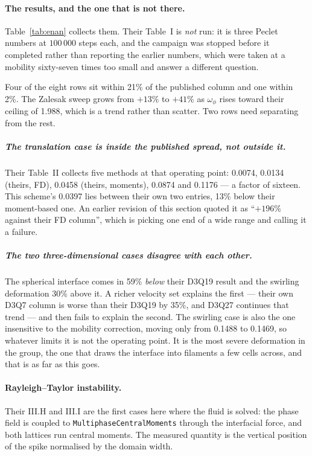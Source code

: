 \documentclass[11pt,a4paper]{article}
\newcommand{\code}[1]{\texttt{\small #1}}
\begin{document}
\paragraph{The results, and the one that is not there.} Table~\ref{tab:enan}
collects them. Their Table~I is \emph{not} run: it is three Peclet numbers at
$100\,000$ steps each, and the campaign was stopped before it completed rather
than reporting the earlier numbers, which were taken at a mobility sixty-seven
times too small and answer a different question.

Four of the eight rows sit within 21\% of the published column and one within
2\%. The Zalesak sweep grows from $+13\%$ to $+41\%$ as $\omega_\phi$ rises
toward their ceiling of 1.988, which is a trend rather than scatter. Two rows
need separating from the rest.

\subparagraph{The translation case is inside the published spread, not outside
it.} Their Table~II collects five methods at that operating point: 0.0074,
0.0134 (theirs, FD), 0.0458 (theirs, moments), 0.0874 and 0.1176 --- a factor
of sixteen. This scheme's 0.0397 lies between their own two entries, 13\% below
their moment-based one. An earlier revision of this section quoted it as
``$+196\%$ against their FD column'', which is picking one end of a wide range
and calling it a failure.

\subparagraph{The two three-dimensional cases disagree with each other.} The
spherical interface comes in 59\% \emph{below} their D3Q19 result and the
swirling deformation 30\% above it. A richer velocity set explains the first
--- their own D3Q7 column is worse than their D3Q19 by 35\%, and D3Q27
continues that trend --- and then fails to explain the second. The swirling
case is also the one insensitive to the mobility correction, moving only from
0.1488 to 0.1469, so whatever limits it is not the operating point. It is the
most severe deformation in the group, the one that draws the interface into
filaments a few cells across, and that is as far as this goes.

\paragraph{Rayleigh--Taylor instability.} Their III.H and III.I are the first
cases here where the fluid is solved: the phase field is coupled to
\code{MultiphaseCentralMoments} through the interfacial force, and both
lattices run central moments. The measured quantity is the vertical position of
the spike normalised by the domain width.
\end{document}
